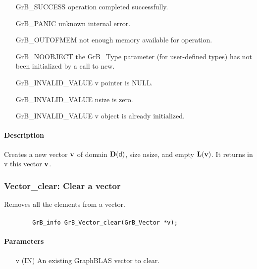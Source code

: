 \begin{itemize}[leftmargin=2.1in]
\item[{\sf GrB\_SUCCESS}]    operation completed successfully.
\item[{\sf GrB\_PANIC}]      unknown internal error.
\item[{\sf GrB\_OUTOFMEM}]   not enough memory available for operation.
\item[{\sf GrB\_NOOBJECT}]   the {\sf GrB\_Type} parameter (for user-defined
                             types) has not been initialized by a
                             call to {\sf new}.
\item[{\sf GrB\_INVALID\_VALUE}]    {\sf v} pointer is {\sf NULL}.
\item[{\sf GrB\_INVALID\_VALUE}]    {\sf nsize} is zero.
\item[{\sf GrB\_INVALID\_VALUE}]    {\sf v} object is already initialized.
\end{itemize}

\paragraph{Description}

Creates a new vector ${\bf v}$ of domain $\bold{D}({\sf d})$, size {\sf nsize}, 
and empty $\bold{L}({\bf v})$. It returns in {\sf v} this vector ${\bf v}$.

\subsubsection{{\sf Vector\_clear}: Clear a vector}

Removes all the elements from a vector.

\paragraph{\syntax}

\begin{verbatim}
        GrB_info GrB_Vector_clear(GrB_Vector *v);
\end{verbatim}

\paragraph{Parameters}

\begin{itemize}[leftmargin=1.1in]
    \item[{\sf v}] ({\sf IN}) An existing GraphBLAS vector to clear.
\end{itemize}

